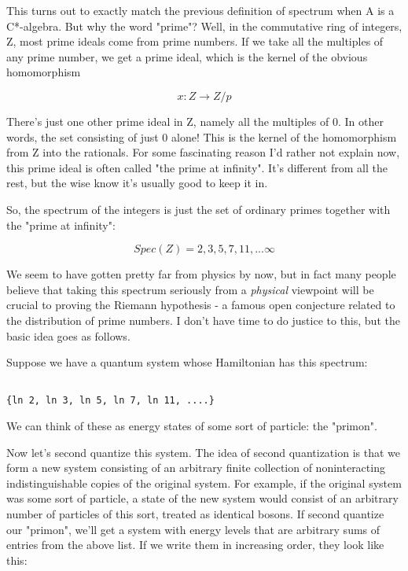 This turns out to exactly match the previous definition of spectrum when A 
is a C*-algebra.  But why the word "prime"?  Well, in the commutative 
ring of integers, Z, most prime ideals come from prime numbers.  If we 
take all the multiples of any prime number, we get a prime ideal, which 
is the kernel of the obvious homomorphism


$$

x: Z \to  Z/p
$$
    

There's just one other prime ideal in Z, namely all the multiples of
0.  In other words, the set consisting of just 0 alone!  This is the
kernel of the homomorphism from Z into the rationals.  For some
fascinating reason I'd rather not explain now, this prime ideal is
often called "the prime at infinity".  It's different from all the
rest, but the wise know it's usually good to keep it in.

So, the spectrum of the integers is just the set of ordinary primes
together with the "prime at infinity":


$$

Spec(Z) = {2, 3, 5, 7, 11, ... \infty }
$$
    

We seem to have gotten pretty far from physics by now, but in fact many 
people believe that taking this spectrum seriously from a \emph{physical}
viewpoint will be crucial to proving the Riemann hypothesis - a famous 
open conjecture related to the distribution of prime numbers.  I don't 
have time to do justice to this, but the basic idea goes as follows.  

Suppose we have a quantum system whose Hamiltonian has this spectrum:


\begin{verbatim}

{ln 2, ln 3, ln 5, ln 7, ln 11, ....}
\end{verbatim}
    
We can think of these as energy states of some sort of particle: the
"primon".  

Now let's second quantize this system.  The idea of second quantization 
is that we form a new system consisting of an arbitrary finite collection 
of noninteracting indistinguishable copies of the original system.  For 
example, if the original system was some sort of particle, a state of 
the new system would consist of an arbitrary number of particles of 
this sort, treated as identical bosons.  If second quantize our "primon",
we'll get a system with energy levels that are arbitrary sums of entries 
from the above list.  If we write them in increasing order, they look 
like this:


